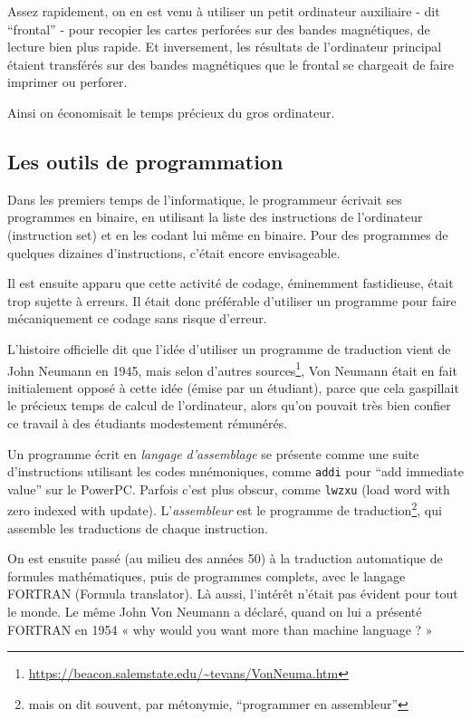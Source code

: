 \begin{multicols}{2}
Assez rapidement, on en est venu à utiliser un petit ordinateur
auxiliaire - dit ``frontal'' - pour recopier les cartes perforées sur
des bandes magnétiques, de lecture bien plus rapide. Et inversement,
les résultats de l'ordinateur principal étaient transférés sur des
bandes magnétiques que le frontal se chargeait de faire
imprimer ou perforer.

Ainsi on économisait le temps précieux du gros ordinateur.

\subsection{Les outils de programmation}

Dans les premiers temps de l'informatique, le programmeur écrivait ses
programmes en binaire, en utilisant la liste des instructions de
l'ordinateur (instruction set) et en les codant lui même en binaire.
Pour des programmes de quelques dizaines d'instructions, c'était
encore envisageable.

Il est ensuite apparu que cette activité de codage, éminemment fastidieuse,
était trop sujette à erreurs. Il était donc préférable d'utiliser 
un programme  pour faire mécaniquement ce codage sans risque d'erreur. 

L'histoire officielle dit que l'idée d'utiliser un programme de
traduction vient de John Neumann en 1945, mais selon d'autres
sources\footnote{\url{https://beacon.salemstate.edu/~tevans/VonNeuma.htm}},
Von Neumann était en fait initialement opposé à cette idée (émise par
un étudiant), parce que cela gaspillait le précieux temps de calcul de
l'ordinateur, alors qu'on pouvait très bien confier ce travail à
des étudiants modestement rémunérés.

Un programme écrit en \emph{langage d'assemblage} se présente comme
une suite d'instructions utilisant les codes mnémoniques, comme
\texttt{addi} pour ``add immediate value'' sur le PowerPC. Parfois
c'est plus obscur, comme \texttt{lwzxu} (load word with zero indexed
with update). L'\emph{assembleur} est le programme de
traduction\footnote{mais on dit souvent, par métonymie,
``programmer en assembleur''}, qui assemble les traductions de
chaque instruction.

On est ensuite passé (au milieu des années 50) à la traduction
automatique de formules mathématiques, puis de programmes complets,
avec le langage FORTRAN (Formula translator). Là aussi, l'intérêt
n'était pas évident pour tout le monde. Le même John Von Neumann a
déclaré, quand on lui a présenté FORTRAN en 1954 « why would you want
  more than machine language ? »


\end{multicols}
